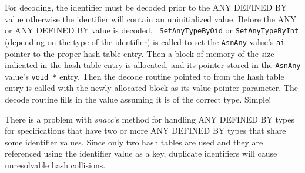 For decoding, the identifier must be decoded prior to the ANY DEFINED
BY value otherwise the identifier will contain an uninitialized value.
Before the ANY or ANY DEFINED BY value is decoded, {\tt
SetAnyTypeByOid} or {\tt SetAnyTypeByInt} (depending on the type of
the identifier) is called to set the {\tt AsnAny} value's {\tt ai}
pointer to the proper hash table entry.  Then a block of memory of the
size indicated in the hash table entry is allocated, and its pointer
stored in the {\tt AsnAny} value's {\tt void *} entry.  Then the decode
routine pointed to from the hash table entry is called with the newly
allocated block as its value pointer parameter.  The decode routine
fills in the value assuming it is of the correct type. Simple!

There is a problem with {\em snacc}'s method for handling ANY DEFINED
BY types for specifications that have two or more ANY DEFINED BY types
that share some identifier values.  Since only two hash tables are
used and they are referenced using the identifier value as a key,
duplicate identifiers will cause unresolvable hash collisions.

